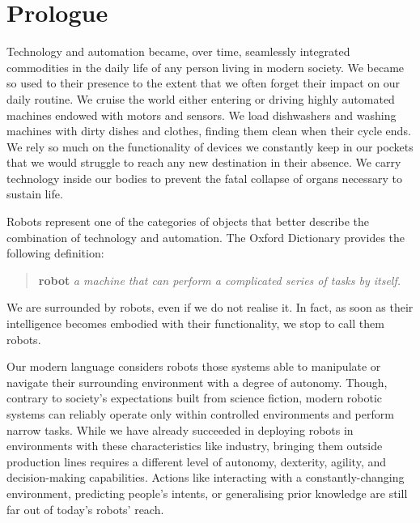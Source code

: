 \cleardoublepage
{}
{}

\acresetall
\chapter*{Prologue}

Technology and automation became, over time, seamlessly integrated commodities in the daily life of any person living in modern society.
We became so used to their presence to the extent that we often forget their impact on our daily routine.
We cruise the world either entering or driving highly automated machines endowed with motors and sensors.
We load dishwashers and washing machines with dirty dishes and clothes, finding them clean when their cycle ends.
We rely so much on the functionality of devices we constantly keep in our pockets that we would struggle to reach any new destination in their absence.
We carry technology inside our bodies to prevent the fatal collapse of organs necessary to sustain life.

Robots represent one of the categories of objects that better describe the combination of technology and automation.
The Oxford Dictionary provides the following definition:
%
\begin{quote}
    \hspace{-8.5mm}
    \textbf{robot} \textit{a machine that can perform a complicated series of tasks by itself.}
\end{quote}
%
We are surrounded by robots, even if we do not realise it.
In fact, as soon as their intelligence becomes embodied with their functionality, we stop to call them robots.

Our modern language considers robots those systems able to manipulate or navigate their surrounding environment with a degree of autonomy.
Though, contrary to society's expectations built from science fiction, modern robotic systems can reliably operate only within controlled environments and perform narrow tasks.
While we have already succeeded in deploying robots in environments with these characteristics like industry, bringing them outside production lines requires a different level of autonomy, dexterity, agility, and decision-making capabilities.
Actions like interacting with a constantly-changing environment, predicting people's intents, or generalising prior knowledge are still far out of today’s robots' reach.

